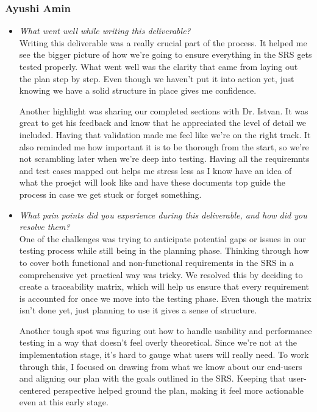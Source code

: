 \documentclass[12pt, titlepage]{article}
\begin{document}
\begin{appendices}
\begin{itemize}
\end{itemize}

\subsubsection*{Ayushi Amin}
\begin{itemize}
  \item \textit{What went well while writing this deliverable?} \\ 

  Writing this deliverable was a really crucial part of the process. It 
  helped me see the bigger picture of how we’re going to ensure everything 
  in the SRS gets tested properly. What went well was the clarity that came 
  from laying out the plan step by step. Even though we haven’t put it into 
  action yet, just knowing we have a solid structure in place gives me confidence.
  
  Another highlight was sharing our completed sections with Dr. Istvan. It 
  was great to get his feedback and know that he appreciated the level of 
  detail we included. Having that validation made me feel like we’re on the 
  right track. It also reminded me how important it is to be thorough from 
  the start, so we’re not scrambling later when we’re deep into testing.
  Having all the requiremnts and test cases mapped out helps me stress less
  as I know have an idea of what the proejct will look like and have these 
  documents top guide the process in case we get stuck or forget something.

  \item \textit{What pain points did you experience during this deliverable, and how did you resolve them?}\\ 
  
  One of the challenges was trying to anticipate potential gaps or issues 
  in our testing process while still being in the planning phase. Thinking 
  through how to cover both functional and non-functional requirements in
  the SRS in a comprehensive yet practical way was tricky. We resolved this
  by deciding to create a traceability matrix, which will help us ensure that 
  every requirement is accounted for once we move into the testing phase. Even 
  though the matrix isn’t done yet, just planning to use it gives a sense 
  of structure. 

  Another tough spot was figuring out how to handle usability and performance 
  testing in a way that doesn’t feel overly theoretical. Since we’re not at the 
  implementation stage, it’s hard to gauge what users will really need. To work 
  through this, I focused on drawing from what we know about our end-users and 
  aligning our plan with the goals outlined in the SRS. Keeping that user-centered 
  perspective helped ground the plan, making it feel more actionable even at this 
  early stage.
\end{itemize}


\end{appendices}
\end{document}
